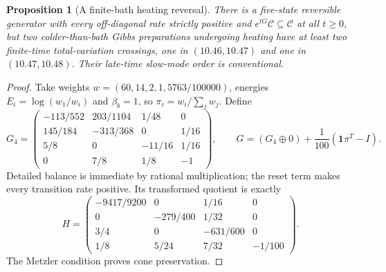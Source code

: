 \documentclass[11pt,a4paper]{article}
\newtheorem{proposition}[theorem]{Proposition}
\theoremstyle{remark}\newtheorem{remark}[theorem]{Remark}
\newcommand{\C}{\mathcal C}
\newcommand{\one}{\mathbf 1}
\begin{document}
\begin{proposition}[A finite-bath heating reversal]\label{prop:TV}
There is a five-state reversible generator with every off-diagonal rate strictly positive and $e^{tG}\C\subseteq\C$ at all $t\ge0$, but two colder-than-bath Gibbs preparations undergoing heating have at least two finite-time total-variation crossings, one in $(10.46,10.47)$ and one in $(10.47,10.48)$. Their late-time slow-mode order is conventional.
\end{proposition}
\begin{proof}
Take weights $w=(60,14,2,1,5763/100000)$, energies $E_i=\log(w_1/w_i)$ and $\beta_b=1$, so $\pi_i=w_i/\sum_jw_j$. Define
\begin{equation}
 G_4=\begin{pmatrix}
 -113/552&203/1104&1/48&0\\
 145/184&-313/368&0&1/16\\
 5/8&0&-11/16&1/16\\
 0&7/8&1/8&-1
 \end{pmatrix},\qquad
 G=(G_4\oplus0)+\frac1{100}(\one\pi^T-I).
 \label{eq:tvG}
\end{equation}
Detailed balance is immediate by rational multiplication; the reset term makes every transition rate positive. Its transformed quotient is exactly
\begin{equation}
 H=\begin{pmatrix}
 -9417/9200&0&1/16&0\\
 0&-279/400&1/32&0\\
 3/4&0&-631/600&0\\
 1/8&5/24&7/32&-1/100
 \end{pmatrix}.
 \label{eq:tvH}
\end{equation}
The Metzler condition proves cone preservation.


\end{proof}
\end{document}
